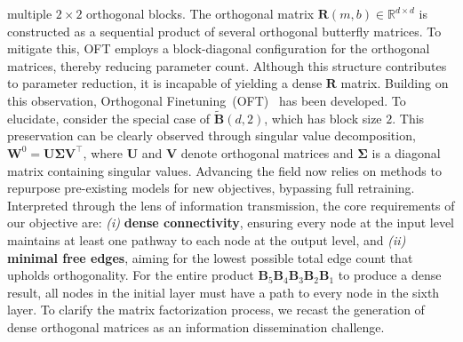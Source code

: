 multiple $2\times 2$ orthogonal blocks. The orthogonal matrix $\bm{R}(m,b)\in\mathbb{R}^{d\times d}$ is constructed as a sequential product of several orthogonal butterfly matrices. To mitigate this, OFT employs a block-diagonal configuration for the orthogonal matrices, thereby reducing parameter count. Although this structure contributes to parameter reduction, it is incapable of yielding a dense $\bm{R}$ matrix. Building on this observation, Orthogonal Finetuning~(OFT)~\cite{qiu2023controlling} has been developed. To elucidate, consider the special case of $\tilde{\bm{B}}(d,2)$, which has block size $2$. This preservation can be clearly observed through singular value decomposition, $\bm{W}^0=\bm{U}\bm{\Sigma}\bm{V}^\top$, where $\bm{U}$ and $\bm{V}$ denote orthogonal matrices and $\bm{\Sigma}$ is a diagonal matrix containing singular values. Advancing the field now relies on methods to repurpose pre-existing models for new objectives, bypassing full retraining. Interpreted through the lens of information transmission, the core requirements of our objective are: \emph{(i)} \textbf{dense connectivity}, ensuring every node at the input level maintains at least one pathway to each node at the output level, and \emph{(ii)} \textbf{minimal free edges}, aiming for the lowest possible total edge count that upholds orthogonality. For the entire product $\bm{B}_5\bm{B}_4\bm{B}_3\bm{B}_2\bm{B}_1$ to produce a dense result, all nodes in the initial layer must have a path to every node in the sixth layer. To clarify the matrix factorization process, we recast the generation of dense orthogonal matrices as an information dissemination challenge.